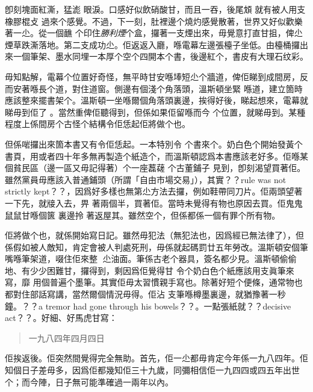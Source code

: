 卽刻塊面紅澌，猛滮
%
眼淚。口感好似飲硝酸甘，而且一吞，後尾䪴
%
就有被人用支橡膠棍攴
%
過來个感覺。不過，下一刻，肚裡邊个燒灼感覺散著，世界又好似歡樂著一尐。從一個䩌
%
个印住\emph{勝利煙}个盒，攞著一支煙出來，毋覺意打直甘抯，俾尐煙草跌澌落地。第二支成功尐。佢返返入廳，喺電幕左邊張檯子坐低。由檯桶攞出來一個筆架、墨水同埋一本厚个空个四開本个書，後邊紅个，書皮有大理石纹彩。

毋知點解，電幕个位置好奇怪，無平時甘安喺埲短尐个牆道，俾佢睇到成間房，反而安著喺長个道，對住道窗。側邊有個淺个角落頭，溫斯頓坐緊
%
喺道，建立箇時應該整來擺書架个。溫斯頓一坐喺爾個角落頭裏邊，挨得好後，睇起想來，電幕就睇毋到佢了
%
。當然重俾佢聽得到，但係如果佢留喺而今
%
个位置，就睇毋到。某種程度上係間房个古怪个結構令佢恁起佢將做个也。

但係啱攞出來箇本書又有令佢恁起。一本特別令
%
个書來个。奶白色个開始發黃个書頁，用或者四十年多無再製造个紙造个，而溫斯頓認爲本書應該老好多。佢喺某個貧民區（邊一區又毋記得著）个一座藞䕢
个古董鋪子
%
見到，卽刻渴望買著佢。雖然黨員毋應該入普通鋪頭（所謂「自由市場交易」），其實？？rule was not strictly kept？？，因爲好多樣也無第尐方法去攞，例如鞋帶同刀片。佢兩頭望著一下先，就𤗈入去，畀
%
著兩個半，買著佢。當時未覺得有物也原因去買。佢鬼鬼鼠鼠甘喺個篋
%
裏邊拎
%
著返屋其。雖然空个，但係都係一個有罪个所有物。

佢將做个也，就係開始寫日記。雖然毋犯法（無犯法也，因爲經已無法律了），但係假如被人敵知，肯定會被人判處死刑，毋係就起碼罰廿五年勞改。溫斯頓安個筆嘴喺筆架道，啜住佢來整𠞉
%
尐油面。筆係古老个器具，簽名都少見。溫斯頓偷偷地、有少少困難甘，攞得到，剩因爲佢覺得甘
%
令个奶白色个紙應該用支眞筆來寫，靡
%
用個普遍个墨筆。其實佢毋太習慣親手寫也。除著好短个便條，通常物也都對住部話寫講，當然爾個情況毋得。佢沾
%
支筆喺樽墨裏邊，就猶豫著一秒鐘。？？a tremor had gone through his bowels？？。一點張紙就？？decisive act？？。好細、好馬虎甘寫：
\begin{quote}
一九八四年四月四日
\end{quote}%
佢挨返後。佢突然間覺得完全無助。首先，佢一尐都毋肯定今年係一九八四年。佢知個日子差毋多，因爲佢都幾知佢三十九歲，同彌相信佢一九四四或四五年出世个；而今陣，日子無可能準確過一兩年以內。


